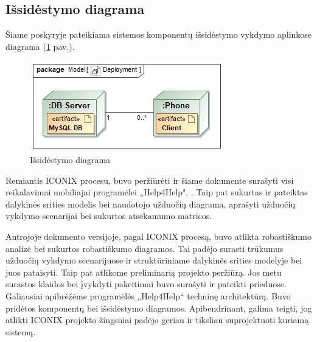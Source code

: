 \documentclass{VUMIFPSbakalaurinis}
\begin{document}
\subsection{Išsidėstymo diagrama}
Šiame poskyryje pateikiama sistemos komponentų išsidėstymo vykdymo aplinkose diagrama (\ref{img:deployment} pav.).
\begin{figure}[h]
	\centering
	\includegraphics[scale=0.7]{img/Deployment}
	\caption{Išsidėstymo diagrama}
	\label{img:deployment}
\end{figure}

Remiantis ICONIX procesu, buvo peržiūrėti ir šiame dokumente surašyti visi reikalavimai mobiliajai programėlei „Help4Help", . Taip pat sukurtas ir pateiktas dalykinės srities modelis bei naudotojo užduočių diagrama, aprašyti užduočių vykdymo scenarijai bei sukurtos atsekamumo matricos.
\par Antrojoje dokumento versijoje, pagal ICONIX procesą, buvo atlikta robastiškumo analizė bei sukurtos robastiškumo diagramos. Tai padėjo surasti trūkumus užduočių vykdymo scenarijuose ir struktūriniame dalykinės srities modelyje bei juos pataisyti. Taip pat atlikome preliminarią projekto peržiūrą. Jos metu surastos klaidos bei įvykdyti pakeitimai buvo surašyti ir pateikti prieduose. Galiausiai apibrėžėme programėlės „Help4Help“ techninę architektūrą. Buvo pridėtos komponentų bei išsidėstymo diagramos. Apibendrinant, galima teigti, jog atlikti ICONIX projekto žingsniai padėjo geriau ir tiksliau suprojektuoti kuriamą sistemą.

\printbibliography[heading=bibintoc]  %
\end{document}
